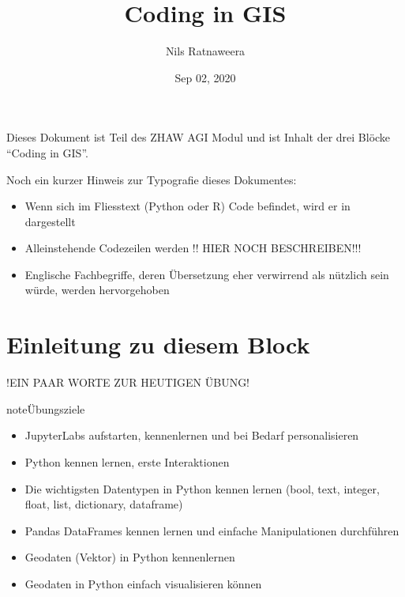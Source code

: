 \documentclass[letterpaper,10pt,english]{sphinxmanual}
\title{Coding in GIS}
\date{Sep 02, 2020}
\author{Nils Ratnaweera}
\begin{document}
\pagestyle{empty}
\sphinxmaketitle
\pagestyle{plain}
\sphinxtableofcontents
\pagestyle{normal}
\label{\detokenize{intro::doc}}


Dieses Dokument ist Teil des ZHAW AGI Modul und ist Inhalt der drei Blöcke “Coding in GIS”.

Noch ein kurzer Hinweis zur Typografie dieses Dokumentes:
\begin{itemize}
\item {} 
Wenn sich im Fliesstext (Python\sphinxhyphen{} oder R\sphinxhyphen{}) Code befindet, wird er in  dargestellt

\item {} 
Alleinstehende Codezeilen werden  !! HIER NOCH BESCHREIBEN!!!

\item {} 
Englische Fachbegriffe, deren Übersetzung eher verwirrend als nützlich sein würde, werden  hervorgehoben

\end{itemize}


\chapter{Einleitung zu diesem Block}
\label{\detokenize{01_01_Einleitung:einleitung-zu-diesem-block}}\label{\detokenize{01_01_Einleitung::doc}}
!EIN PAAR WORTE ZUR HEUTIGEN ÜBUNG!

\begin{sphinxadmonition}{note}{Übungsziele}
\begin{itemize}
\item {} 
JupyterLabs aufstarten, kennenlernen und bei Bedarf personalisieren

\item {} 
Python kennen lernen, erste Interaktionen

\item {} 
Die wichtigsten Datentypen in Python kennen lernen (bool, text, integer, float, list, dictionary, dataframe)

\item {} 
Pandas DataFrames kennen lernen und einfache Manipulationen durchführen

\item {} 
Geodaten (Vektor) in Python kennenlernen

\item {} 
Geodaten in Python einfach visualisieren können

\end{itemize}
\end{sphinxadmonition}
\end{document}
